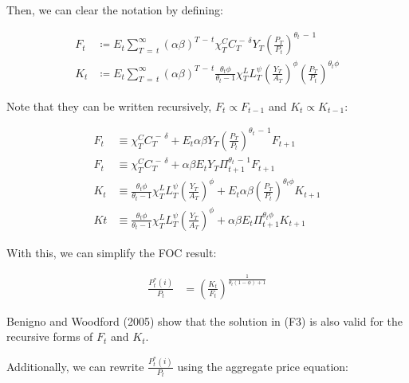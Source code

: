 \documentclass[12pt]{article}
\begin{document}
Then, we can clear the notation by defining:

\begin{align*}
    F_{t} &\coloneqq E_{t}\sum_{T\,=\,t}^{\infty}\left(\alpha\beta\right)^{T\,-\,t}\chi_{T}^{C}C_{T}^{\,-\,\delta}Y_{T}\left(\frac{P_{T}}{P_{t}}\right)^{\theta_{t}\,-\,1}\\
    K_{t} &\coloneqq E_{t}\sum_{T\,=\,t}^{\infty}\left(\alpha\beta\right)^{T\,-\,t}\!\frac{\theta_{t}\phi}{\theta_{t}-1}\chi_{T}^{L}L_{T}^{\psi}\left(\frac{Y_{T}}{A_{T}}\right)^{\phi}\left(\frac{P_{T}}{P_{t}}\right)^{\theta_{t}\phi}
\end{align*}

Note that they can be written recursively, $F_t \propto F_{t-1}$ and $K_t \propto K_{t-1}$:

\begin{align*}
    F_{t} &\equiv \chi_{T}^{C}C_{T}^{\,-\,\delta} +  E_{t}\alpha\beta Y_{T}\left(\frac{P_{T}}{P_{t}}\right)^{\theta_{t}\,-\,1}F_{t+1}\\
    F_{t} &\equiv \chi_{T}^{C}C_{T}^{\,-\,\delta} +  \alpha\beta E_{t}Y_{T}\Pi_{t+1}^{\theta_{t}\,-\,1}F_{t+1} \tag{8}\\
    K_{t} &\equiv \frac{\theta_{t}\phi}{\theta_{t}-1}\chi_{T}^{L}L_{T}^{\psi}\left(\frac{Y_{T}}{A_{T}}\right)^{\phi} + E_t \alpha\beta \left(\frac{P_{T}}{P_{t}}\right)^{\theta_{t}\phi}K_{t+1}\\
    K{t} &\equiv \frac{\theta_{t}\phi}{\theta_{t}-1}\chi_{T}^{L}L_{T}^{\psi}\left(\frac{Y_{T}}{A_{T}}\right)^{\phi} + \alpha\beta E_t \Pi_{t+1}^{\theta_{t}\phi}K_{t+1} \tag{9}
\end{align*}

With this, we can simplify the FOC result:

\begin{align*}
    \frac{P^*_{t}(i)}{P_{t}} &= \left(\frac{K_t}{F_t}\right)^\frac{1}{\theta_t(1-\phi)+1} \tag{F3}
\end{align*}

Benigno and Woodford (2005) show that the solution in (F3) is also valid for the recursive forms of $F_t$ and $K_t$. %

Additionally, we can rewrite $\frac{P^*_{t}(i)}{P_{t}}$ using the aggregate price equation:
\end{document}
